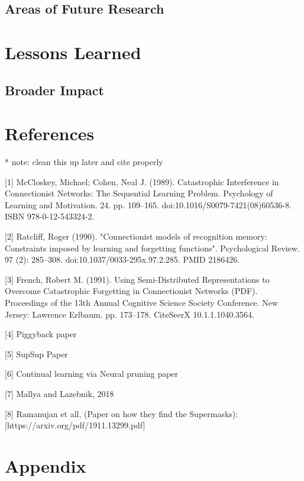 \documentclass{article}
\begin{document}
\subsection{Areas of Future Research}

\section{Lessons Learned}
\subsection{Broader Impact}

\section*{References}
\small
* note: clean this up later and cite properly

[1] McCloskey, Michael; Cohen, Neal J. (1989). Catastrophic Interference in Connectionist Networks: The Sequential Learning Problem. Psychology of Learning and Motivation. 24. pp. 109–165. doi:10.1016/S0079-7421(08)60536-8. ISBN 978-0-12-543324-2.

[2] Ratcliff, Roger (1990). "Connectionist models of recognition memory: Constraints imposed by learning and forgetting functions". Psychological Review. 97 (2): 285–308. doi:10.1037/0033-295x.97.2.285. PMID 2186426.

[3] French, Robert M. (1991). Using Semi-Distributed Representations to Overcome Catastrophic Forgetting in Connectionist Networks (PDF). Proceedings of the 13th Annual Cognitive Science Society Conference. New Jersey: Lawrence Erlbaum. pp. 173–178. CiteSeerX 10.1.1.1040.3564.

[4] Piggyback paper

[5] SupSup Paper 

[6] Continual learning via Neural pruning paper 

[7] Mallya and Lazebnik, 2018

[8] Ramanujan et all, (Paper on how they find the Supermasks): [https://arxiv.org/pdf/1911.13299.pdf]


\section*{Appendix}
\end{document}
